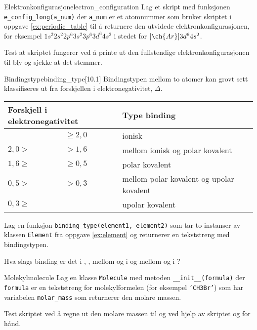\begin{exercise}{Elektronkonfigurasjon}{electron_configuration}
	\subexercise Lag et skript med funksjonen \texttt{e_config_long(a_num)} der \texttt{a_num} er et atomnummer som bruker skriptet i oppgave \ref{ex:periodic_table} til å returnere den utvidede elektronkonfigurasjonen, for eksempel $1s^2 2s^2 2p^6 3s^2 3p^6 3d^6 4s^2$ i stedet for $[\ch{Ar}] 3d^6 4s^2$.
	
	\subexercise Test at skriptet fungerer ved å printe ut den fullstendige elektronkonfigurasjonen til bly og sjekke at det stemmer.
\end{exercise}

\begin{exercise}{Bindingstype}{binding_type}[10.1]
	Bindingstypen mellom to atomer kan grovt sett klassifiseres ut fra forskjellen i elektronegativitet, $\Delta$. \\
	
	{\renewcommand{\arraystretch}{1.2}
		\centering
		\begin{tabular}{l@{$\Delta$}ll}
			\toprule 
			\multicolumn{2}{l}{Forskjell i elektronegativitet} & Type binding \\ \midrule 
			        &$\ge2,0$ & ionisk \\ 
			  $2,0>$&$>1,6$   & mellom ionisk og polar kovalent \\ 
			$1,6\ge$&$\ge0,5$ & polar kovalent \\ 
			  $0,5>$&$>0,3$   & mellom polar kovalent og upolar kovalent \\ 
			$0,3\ge$&         & upolar kovalent\\
			\bottomrule
		\end{tabular}\par
	}
	
	\subexercise Lag en funksjon \texttt{binding_type(element1, element2)} som tar to instanser av klassen \texttt{Element} fra oppgave \ref{ex:element} og returnerer en tekststreng med bindingstypen.
	
	\subexercise Hva slags binding er det i , , mellom  og  i  og mellom  og  i ?
\end{exercise}

\begin{exercise}{Molekyl}{molecule}
	Lag en klasse \texttt{Molecule} med metoden \texttt{__init__(formula)} der \texttt{formula} er en tekststreng for molekylformelen (for eksempel \texttt{'CH3Br'}) som har variabelen \texttt{molar_mass} som returnerer den molare massen.
	
	Test skriptet ved å regne ut den molare massen til  og  ved hjelp av skriptet og for hånd.
\end{exercise}

